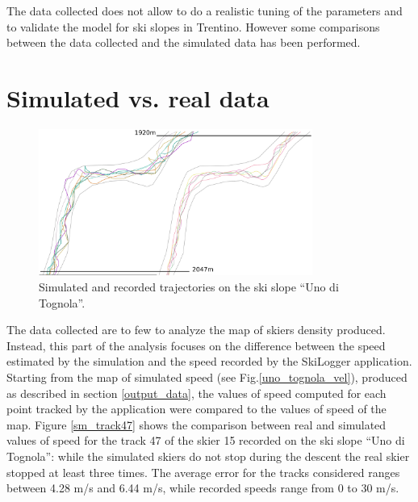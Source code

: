 \documentclass[12pt,a4paper,twoside]{book}
\begin{document}
The data collected does not allow to do a realistic tuning of the parameters and to validate the model for ski slopes in Trentino. However some comparisons between the data collected and the simulated data has been performed.

\section{Simulated vs. real data}
\begin{figure}[!h]
  \centering
    \includegraphics[width=0.8\textwidth]{images/traiettorie.eps}
    \caption{Simulated and recorded trajectories on the ski slope ``Uno di Tognola''.}\label{traj}
\end{figure}

The data collected are to few to analyze the map of skiers density produced. Instead, this part of the analysis focuses on the difference between the speed estimated by the simulation and the speed recorded by the SkiLogger application. Starting from the map of simulated speed (see Fig.\ref{uno_tognola_vel}), produced as described in section \ref{output_data}, the values of speed computed for each point tracked by the application were compared to the values of speed of the map. Figure \ref{sm_track47} shows the comparison between real and simulated values of speed for the track 47 of the skier 15 recorded on the ski slope ``Uno di Tognola'': while the simulated skiers do not stop during the descent the real skier stopped at least three times. The average error for the tracks considered ranges between 4.28 m/s and 6.44 m/s, while recorded speeds range from 0 to 30 m/s.
\end{document}
